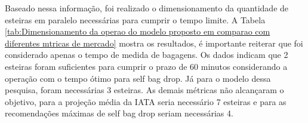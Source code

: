     Baseado nessa informação, foi realizado o dimensionamento da quantidade de esteiras em paralelo necessárias para cumprir o tempo limite. A Tabela \ref{tab:Dimensionamento da operao do modelo proposto em comparao com diferentes mtricas de mercado} mostra os resultados, é importante reiterar que foi considerado apenas o tempo de medida de bagagens. Os dados indicam que 2 esteiras foram suficientes para cumprir o prazo de 60 minutos considerando a operação com o tempo ótimo para self bag drop. Já para o modelo dessa pesquisa, foram necessárias 3 esteiras. As demais métricas não alcançaram o objetivo, para a projeção média da IATA seria necessário 7 esteiras e para as recomendações máximas de self bag drop seriam necessárias 4. 

\begin{table}[h!]
\centering
{}
\end{table}
